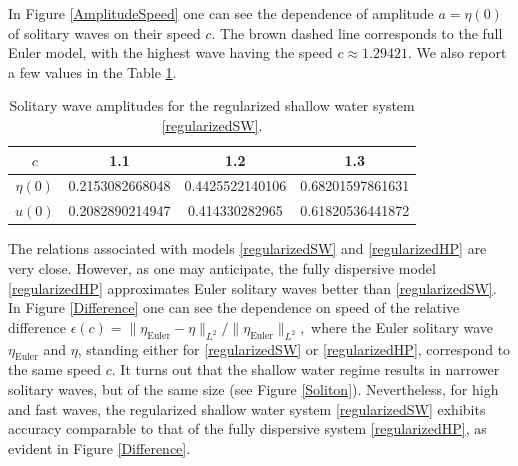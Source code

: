 \documentclass[reqno,12pt,a4paper]{article}
\theoremstyle{plain}
\begin{document}
In Figure \ref{AmplitudeSpeed}
one can see the dependence of amplitude $a = \eta(0)$
of solitary waves on their speed $c$.
The brown dashed line corresponds to the full Euler model,
with the highest wave having the speed $c \approx 1.29421$.
%
%
%
We also report a few values in the Table \ref{amplitude_speed_table}.
\begin{table}[h!]
    \centering
    \renewcommand{\arraystretch}{1.4} 
    \begin{tabular}{|c|c|c|c|}
        \hline
         $c$        & 1.1 & 1.2 & 1.3
         \\ 
        \hline
         $\eta(0)$
         &
         0.2153082668048
         &
         0.4425522140106
         &
         0.68201597861631
         \\ 
        \hline
         $u(0)$
         &
         0.2082890214947
         &
         0.414330282965
         &
         0.61820536441872
         \\ 
        \hline
    \end{tabular}
    \caption{
        Solitary wave amplitudes for the regularized shallow water system \eqref{regularizedSW}.
    }
    \label{amplitude_speed_table}
\end{table}
%
%
%
The relations associated with models
\eqref{regularizedSW} and \eqref{regularizedHP}
are very close.
However, as one may anticipate, the fully dispersive
model \eqref{regularizedHP}
approximates Euler solitary waves better
than \eqref{regularizedSW}.
In Figure \ref{Difference} one can see the dependence on speed of
the relative difference
\(
	\epsilon(c) =
	{ \lVert \eta_{\text{Euler}} - \eta \rVert _{L^2} }
	/	
	{ \lVert \eta_{\text{Euler}} \rVert _{L^2} }
	,
\)
%
where the Euler solitary wave $\eta_{\text{Euler}}$
and $\eta$, standing either for \eqref{regularizedSW}
or \eqref{regularizedHP}, correspond
to the same speed $c$.
It turns out that the shallow water regime
results in narrower solitary waves, but of the same size
(see Figure \ref{Soliton}).
Nevertheless,
for high and fast waves, the regularized shallow water system \eqref{regularizedSW} exhibits accuracy comparable to that of the fully dispersive system \eqref{regularizedHP},
as evident in Figure \ref{Difference}.


\end{document}
